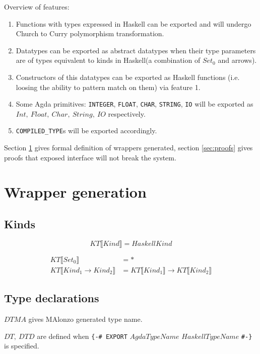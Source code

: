 Overview of features:
\begin{enumerate}
\item Functions with types expressed in Haskell can be exported and will
      undergo Church to Curry polymorphism transformation.
\item Datatypes can be exported as abstract datatypes when their type
      parameters are of types equivalent to kinds in Haskell(a combination
      of \(Set_0\) and arrows).
\item Constructors of this datatypes can be exported as Haskell functions
      (i.e. loosing the ability to pattern match on them) via feature 1.
\item Some Agda primitives: \texttt{INTEGER}, \texttt{FLOAT}, \texttt{CHAR},
      \texttt{STRING}, \texttt{IO} will be exported as \(Int,\ Float,\ Char,\ String,\ IO\)
      respectively.
\item \texttt{COMPILED\_TYPE}s will be exported accordingly.
\end{enumerate}

Section \ref{sec:wrappers} gives formal definition of wrappers generated,
section \ref{sec:proofs} gives proofs that exposed interface will not break the system.

\section{Wrapper generation}\label{sec:wrappers}

\subsection{Kinds}
\[ KT\llbracket Kind \rrbracket = HaskellKind \]

\begin{align*}
   KT\llbracket Set_0 \rrbracket &= *\\
   KT\llbracket Kind_1 \rightarrow Kind_2 \rrbracket &=
      KT\llbracket Kind_1 \rrbracket \rightarrow KT\llbracket Kind_2 \rrbracket
\end{align*}

\subsection{Type declarations}

\(DTMA\) gives MAlonzo generated type name.

\(DT,\ DTD\) are defined when \texttt{\{-\# EXPORT} \(AgdaTypeName\) \(HaskellTypeName\) \texttt{\#-\}} is specified.

